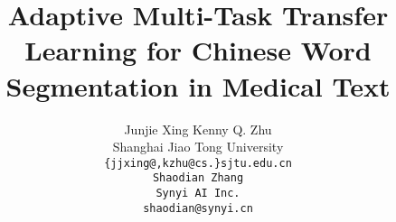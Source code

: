 \documentclass[11pt]{article}
\title{Adaptive Multi-Task Transfer Learning for Chinese Word Segmentation in Medical Text}
\author{
 Junjie Xing \quad\quad Kenny Q. Zhu\\
 Shanghai Jiao Tong University \\
 \tt \{jjxing@,kzhu@cs.\}sjtu.edu.cn \\\And
 Shaodian Zhang \\
 Synyi AI Inc.\\
 {\tt shaodian@synyi.cn} \\
}
\theoremstyle{definition}
\begin{document}
\maketitle

\begin{CJK}{UTF8}{gkai}
  
  
  
  
  
  
  
  
\end{CJK}











\end{document}
